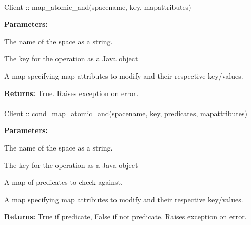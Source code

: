 \paragraph{}
\label{api:java:map_atomic_and}
\begin{javacode}
Client :: map_atomic_and(spacename, key, mapattributes)
\end{javacode}


\noindent\textbf{Parameters:}
\begin{description}[labelindent=\widthof{{\code{mapattributes}}},leftmargin=*,noitemsep,nolistsep,align=right]
\item[\code{spacename}] The name of the space as a string.
\item[\code{key}] The key for the operation as a Java object
\item[\code{mapattributes}] A map specifying map attributes to modify and their respective key/values.
\end{description}

\noindent\textbf{Returns:}
True.  Raises exception on error.

\paragraph{}
\label{api:java:cond_map_atomic_and}
\begin{javacode}
Client :: cond_map_atomic_and(spacename, key, predicates, mapattributes)
\end{javacode}


\noindent\textbf{Parameters:}
\begin{description}[labelindent=\widthof{{\code{mapattributes}}},leftmargin=*,noitemsep,nolistsep,align=right]
\item[\code{spacename}] The name of the space as a string.
\item[\code{key}] The key for the operation as a Java object
\item[\code{predicates}] A map of predicates to check against.
\item[\code{mapattributes}] A map specifying map attributes to modify and their respective key/values.
\end{description}

\noindent\textbf{Returns:}
True if predicate, False if not predicate.  Raises exception on error.

